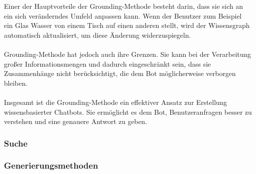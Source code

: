Einer der Hauptvorteile der Grounding-Methode besteht darin, dass sie sich an ein sich veränderndes Umfeld anpassen kann. Wenn der Benutzer zum Beispiel ein Glas Wasser von einem Tisch auf einen anderen stellt, wird der Wissensgraph automatisch aktualisiert, um diese Änderung widerzuspiegeln.\\\\
Grounding-Methode hat jedoch auch ihre Grenzen. Sie kann bei der Verarbeitung großer Informationsmengen und dadurch eingeschränkt sein, dass sie Zusammenhänge nicht berücksichtigt, die dem Bot möglicherweise verborgen bleiben.\\\\
Insgesamt ist die Grounding-Methode ein effektiver Ansatz zur Erstellung wissensbasierter Chatbots. Sie ermöglicht es dem Bot, Benutzeranfragen besser zu verstehen und eine genauere Antwort zu geben.
\subsubsection{Suche}
\subsubsection{Generierungsmethoden}
\endinput